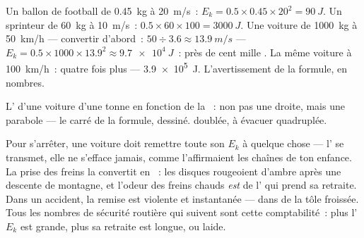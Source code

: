 \begin{example}\label{ex:g9:kinetic-energy-safety:first}
Un ballon de football de \qty{0.45}{kg} à \qty{20}{m/s}~:
$E_k = 0.5 \times 0.45 \times 20^2 = \qty{90}{J}$. Un sprinteur de
\qty{60}{kg} à \qty{10}{m/s}~:
$0.5 \times 60 \times 100 = \qty{3000}{J}$. Une voiture de
\qty{1000}{kg} à \qty{50}{km/h} --- convertir d'abord~:
$50 \div 3.6 \approx \qty{13.9}{m/s}$ ---
$E_k = 0.5 \times 1000 \times 13.9^2 \approx \qty{9.7e4}{J}$~: près
de cent mille . La même voiture à \qty{100}{km/h}~: quatre fois
plus --- \qty{3.9e5}{J}. L'avertissement de la formule, en nombres.
\end{example}

\begin{omfigure}

{\small L' d'une voiture d'une tonne en fonction de
la ~: non pas une droite, mais une parabole --- le carré de la
formule, dessiné.  doublée,  à évacuer quadruplée.}
\end{omfigure}

\begin{example}\label{ex:g9:kinetic-energy-safety:brakes}
Pour s'arrêter, une voiture doit remettre toute son $E_k$ à quelque
chose --- l' se transmet, elle ne s'efface jamais, comme
l'affirmaient les chaînes de ton enfance. La prise des freins la
convertit en ~: les disques rougeoient d'ambre après une
descente de montagne, et l'odeur des freins chauds \emph{est} de
l' qui prend sa retraite. Dans un accident, la remise
est violente et instantanée --- dans de la tôle froissée. Tous les
nombres de sécurité routière qui suivent sont cette comptabilité~:
plus l'$E_k$ est grande, plus sa retraite est longue, ou laide.
\end{example}

